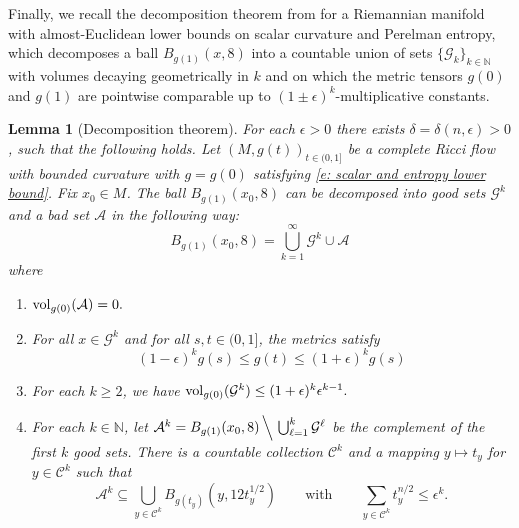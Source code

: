 \documentclass[11pt,reqno]{amsart}
\newtheorem{lemma}[theorem]{Lemma}
\theoremstyle{remark}
\theoremstyle{definition}
\numberwithin{equation}{section}
\newcommand{\e}{{\epsilon}}
\newcommand{\vol}{{\rm{vol}}}
\begin{document}
Finally, we recall  the decomposition theorem from \cite[Theorem~5.1]{LNN1} for a 
Riemannian manifold with almost-Euclidean lower bounds on scalar curvature and Perelman entropy,
which decomposes a ball $B_{g(1)}(x, 8)$ into a countable union of sets $\{\mathcal{G}_k\}_{k \in \mathbb{N}}$ with volumes decaying geometrically in $k$ and on which the metric tensors $g(0)$ and $g(1)$ are pointwise comparable up to $(1\pm \e)^k$-multiplicative constants. 
\begin{lemma}[Decomposition theorem]
	\label{lemma: decomposition}
 For each $\e>0$ there exists $\delta= \delta(n,\e)>0$, such that the following holds. 
 Let $(M,g(t))_{t \in (0,1]}$ be a complete Ricci flow with bounded curvature with $g=g(0)$ satisfying \eqref{e: scalar and entropy lower bound}.
Fix $x_0 \in M$. The ball $B_{g(1)}(x_0,8)$ can be decomposed into good sets $\mathcal{G}^k$ and a bad set $\mathcal{A}$ in the following way:
 \begin{equation}\label{eqn: decomposition}
 	B_{g(1)}(x_0,8) = \bigcup_{k=1}^\infty \mathcal{G}^{k} \cup \mathcal{A}
 \end{equation} 	
 where
 \begin{enumerate}
 	\item\label{item: decomp A vol}  $\vol_{g(0)}(\mathcal{A}) = 0.$
 	\item\label{item: decomp G bounds} For all $x \in \mathcal{G}^{k}$ and for all $s,t\in (0,1]$, the metrics satisfy 
 	\begin{equation}
 		{(1-\e)^{k} g(s) \leq g( t) \leq (1+\e)^{k} g(s)}
	\end{equation}  
 	\item\label{item: decomp volume bounds G} For each $k\geq 2$, we have 
 {	$\vol_{g(0)}(\mathcal{G}^{k}) \leq (1+\e)^{k} \e^{k-1}.$}
 	\item\label{item: decomp Ak bounds}  
 	For each $k\in \mathbb{N}$, let $\mathcal{A}^k = B_{g(1)}(x_0, 8) \, \Big\backslash \,  \bigcup_{\ell=1}^k \mathcal{G}^\ell$ be the complement of the first $k$ good sets. There is a countable collection $\mathcal{C}^k$ and a mapping $y\mapsto t_y$ for $y \in \mathcal{C}^k$ such that 
 	\begin{equation}\label{eqn: content bound 1}
 	 	\mathcal{A}^k \subseteq \bigcup_{y\in\mathcal{C}^k	} B_{g(t_y)}(y, 12t_y^{1/2}) \qquad \text{with} \qquad \sum_{y\in\mathcal{C}^k} t_y^{n/2}\leq  \e^{k}.
 	\end{equation}
 \end{enumerate}

\end{lemma}
\end{document}
